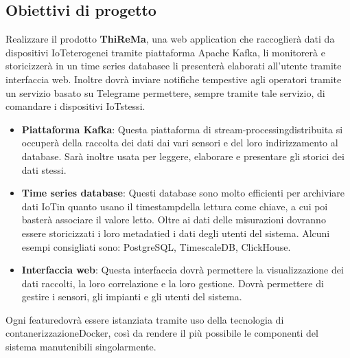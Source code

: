 \subsection{Obiettivi di progetto}
Realizzare il prodotto \textbf{ThiReMa}, una web application che raccoglierà dati da dispositivi IoT\glosp eterogenei tramite piattaforma Apache Kafka, li monitorerà e storicizzerà in un time series database\glosp e li presenterà elaborati all'utente tramite interfaccia web. Inoltre dovrà inviare notifiche tempestive agli operatori tramite un servizio basato su Telegram\glo e permettere, sempre tramite tale servizio, di comandare i dispositivi IoT\glosp stessi.
\begin{itemize}
	\item \textbf{Piattaforma Kafka}: Questa piattaforma di stream-processing\glosp distribuita si occuperà della raccolta dei dati dai vari sensori e del loro indirizzamento al database. Sarà inoltre usata per leggere, elaborare e presentare gli storici dei dati stessi.
	\item \textbf{Time series database}: Questi database sono molto efficienti per archiviare dati IoT\glosp in quanto usano il timestamp\glosp della lettura come chiave, a cui poi basterà associare il valore letto. Oltre ai dati delle misurazioni dovranno essere storicizzati i loro metadati\glosp ed i dati degli utenti del sistema.
	Alcuni esempi consigliati sono: PostgreSQL\glo, TimescaleDB\glo, ClickHouse\glo.
	\item \textbf{Interfaccia web}: Questa interfaccia dovrà permettere la visualizzazione dei dati raccolti, la loro correlazione e la loro gestione. Dovrà permettere di gestire i sensori, gli impianti e gli utenti del sistema.
\end{itemize} 
Ogni feature\glosp dovrà essere istanziata tramite uso della tecnologia di contanerizzazione\glosp Docker\glo, così da rendere il più possibile le componenti del sistema manutenibili singolarmente.


